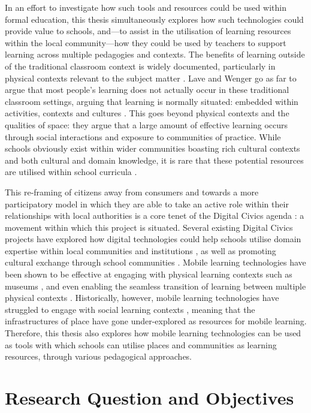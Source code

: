 In an effort to investigate how such tools and resources could be used within formal education, this thesis simultaneously explores how such technologies could provide value to schools, and---to assist in the utilisation of learning resources within the local community---how they could be used by teachers to support learning across multiple pedagogies and contexts. The benefits of learning outside of the traditional classroom context is widely documented, particularly in physical contexts relevant to the subject matter \citep{Fiennes2015, Ofsted2008}. Lave and Wenger go as far to argue that most people's learning does not actually occur in these traditional classroom settings, arguing that learning is normally situated: embedded within activities, contexts and cultures \citep{lave1991situated}. This goes beyond physical contexts and the qualities of space: they argue that a large amount of effective learning occurs through social interactions and exposure to communities of practice. While schools obviously exist within wider communities boasting rich cultural contexts and both cultural and domain knowledge, it is rare that these potential resources are utilised within school curricula \citep{Leat2015}. 

This re-framing of citizens away from consumers and towards a more participatory model in which they are able to take an active role within their relationships with local authorities is a core tenet of the Digital Civics agenda \citep{Olivier2015}: a movement within which this project is situated. Several existing Digital Civics projects have explored how digital technologies could help schools utilise domain expertise within local communities \citep{Dodds2017} and institutions \citep{Megan2019}, as well as promoting cultural exchange through school communities \citep{Sarangapani2016}. Mobile learning technologies have been shown to be effective at engaging with physical learning contexts such as museums \citep{Lonsdale2004}, and even enabling the seamless transition of learning between multiple physical contexts \citep{Wong2011}. Historically, however, mobile learning technologies have struggled to engage with social learning contexts  \citep{Frohberg2009}, meaning that the infrastructures of place have gone under-explored as resources for mobile learning. Therefore, this thesis also explores how mobile learning technologies can be used as tools with which schools can utilise places and communities as learning resources, through various pedagogical approaches.


\section{Research Question and Objectives}
\label{sec:ResearchQuestions}

